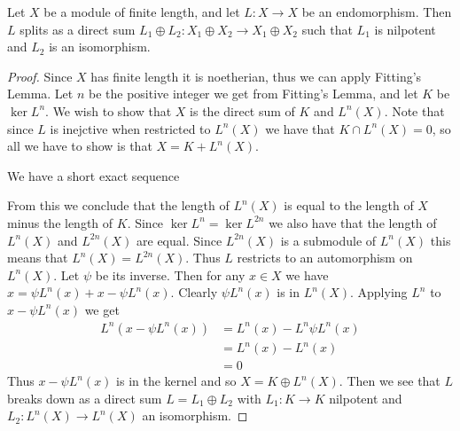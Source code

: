 \begin{cor}
	Let $X$ be a module of finite length, and let $L\colon X\to X$ be an endomorphism. Then $L$ splits as a direct sum $L_1 \oplus L_2 \colon X_1 \oplus X_2 \to X_1 \oplus X_2$ such that $L_1$ is nilpotent and $L_2$ is an isomorphism.
	\begin{proof}
		Since $X$ has finite length it is noetherian, thus we can apply Fitting's Lemma. Let $n$ be the positive integer we get from Fitting's Lemma, and let $K$ be $\ker L^{n}$. We wish to show that $X$ is the direct sum of $K$ and $L^n(X)$. Note that since $L$ is inejctive when restricted to $L^n(X)$ we have that $K \cap L^n(X)=0$, so all we have to show is that $X = K + L^n(X)$.
	
		We have a short exact sequence
		\begin{center}
		\end{center}
		From this we conclude that the length of $L^{n}(X)$ is equal to the length of $X$ minus the length of $K$. Since $\ker L^n = \ker L^{2n}$ we also have that the length of $L^n(X)$ and $L^{2n}(X)$ are equal. Since $L^{2n}(X)$ is a submodule of $L^n(X)$ this means that $L^n(X)=L^{2n}(X)$. Thus $L$ restricts to an automorphism on $L^n(X)$. Let $\psi$ be its inverse. Then for any $x \in X$ we have $x = \psi L^n(x) + x - \psi L^n(x)$. Clearly $\psi L^n(x)$ is in $L^n(X)$. Applying $L^n$ to $x-\psi L^n(x)$ we get
		\begin{align*}
			L^n(x-\psi L^n(x)) &= L^n(x) - L^n \psi L^n (x)\\
			&= L^n(x) - L^n(x)\\
			&= 0
		\end{align*}
		Thus $ x - \psi L^n(x)$ is in the kernel and so $X = K \oplus L^n(X)$. Then we see that $L$ breaks down as a direct sum $L = L_1 \oplus L_2$ with $L_1\colon K \to K$ nilpotent and $L_2 \colon L^n(X) \to L^n(X)$ an isomorphism.
	\end{proof}
\end{cor}